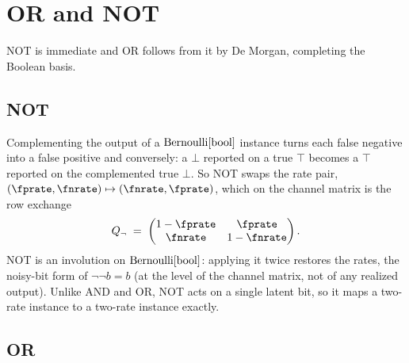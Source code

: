 %
%
%
%

\section{OR and NOT}
\label{sec:or-not}

NOT is immediate and OR follows from it by De Morgan, completing the Boolean
basis.

\subsection*{NOT}

Complementing the output of a $\mathrm{Bernoulli}[\mathrm{bool}]$ instance turns each false
negative into a false positive and conversely: a $\bot$ reported on a true
$\top$ becomes a $\top$ reported on the complemented true $\bot$. So
NOT swaps the rate pair, $(\fprate, \fnrate) \mapsto (\fnrate,
\fprate)$, which on the channel matrix is the row exchange
\begin{equation}
\label{eq:not-Q}
  Q_{\neg} \;=\;
  \begin{pmatrix}
    1 - \fprate & \fprate \\
    \fnrate     & 1 - \fnrate
  \end{pmatrix}.
\end{equation}
NOT is an involution on $\mathrm{Bernoulli}[\mathrm{bool}]$: applying it twice restores the
rates, the noisy-bit form of $\neg\neg b = b$ (at the level of the channel
matrix, not of any realized output). Unlike AND and OR, NOT acts on a single
latent bit, so it maps a two-rate instance to a two-rate instance exactly.

\subsection*{OR}


